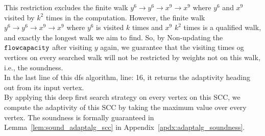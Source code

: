 This restriction excludes the finite walk $y^6 \to y^6 \to x^9 \to x^9$ where $y^6$ and $x^9$ visited by $k^2$ times
in the computation. 
However, the finite walk $y^6 \to y^6 \to x^9 \to x^9$ where $y^6$ is visited $k$ times and $x^9$ $k^2$ times is 
a qualified walk, and exactly the longest walk we aim to find. So, by Non-updating the $\mathtt{flowcapacity}$ after 
visiting $y$ again, we guarantee that the visiting times og vertices on every searched walk will not be restricted by weights not on this walk,
i.e., the soundness.
\\
In the last line of this dfs algorithm, line: 16, it returns the adaptivity heading out from its input vertex.
\\
By applying this deep first search strategy on every vertex on this SCC, 
we compute the adaptivity of this SCC by taking the maximum 
value over every vertex.
%
The soundness is formally guaranteed in Lemma~\ref{lem:sound_adaptalg_scc} in Appendix~\ref{apdx:adaptalg_soundness}.


